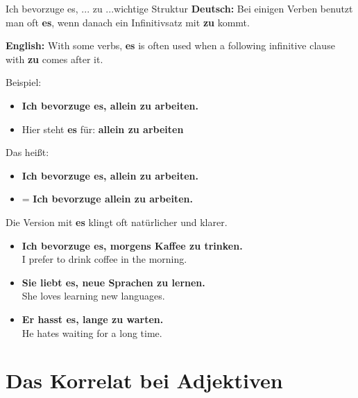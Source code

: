 \documentclass[a4paper,11pt]{article}
\newcommand{\GermanText}[1]{\textbf{Deutsch: }#1\par}
\newcommand{\EnglishText}[1]{{\small\color{SoftGray}\textbf{English: }#1\par}}
\newcommand{\ExampleItem}[2]{\item \textbf{#1}\\{\small\color{SoftGray}#2}}
\begin{document}
        \begin{grammarentry}{Ich bevorzuge es, ... zu ...}{wichtige Struktur}
            \GermanText{Bei einigen Verben benutzt man oft \textbf{es}, wenn danach ein Infinitivsatz mit \textbf{zu} kommt.}
            \EnglishText{With some verbs, \textbf{es} is often used when a following infinitive clause with \textbf{zu} comes after it.}
            
            Beispiel:
            \begin{itemize}
                \item \textbf{Ich bevorzuge es, allein zu arbeiten.}
                \item Hier steht \textbf{es} für: \textbf{allein zu arbeiten}
            \end{itemize}
            
            Das heißt:
            \begin{itemize}
                \item \textbf{Ich bevorzuge es, allein zu arbeiten.}
                \item = \textbf{Ich bevorzuge allein zu arbeiten.}
            \end{itemize}
            
            Die Version mit \textbf{es} klingt oft natürlicher und klarer.
        \end{grammarentry}
        
        \begin{exbox}
            \begin{itemize}
                \ExampleItem{Ich bevorzuge es, morgens Kaffee zu trinken.}{I prefer to drink coffee in the morning.}
                \ExampleItem{Sie liebt es, neue Sprachen zu lernen.}{She loves learning new languages.}
                \ExampleItem{Er hasst es, lange zu warten.}{He hates waiting for a long time.}
            \end{itemize}
        \end{exbox}
    
    
    \section{Das Korrelat bei Adjektiven}
        
\end{document}

